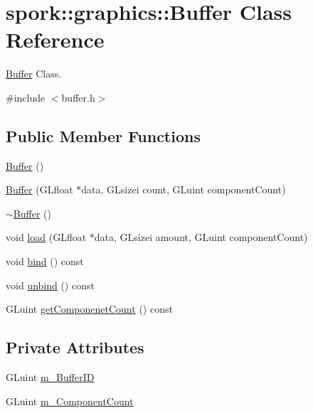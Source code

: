 \hypertarget{classspork_1_1graphics_1_1_buffer}{}\section{spork\+:\+:graphics\+:\+:Buffer Class Reference}
\label{classspork_1_1graphics_1_1_buffer}


\hyperlink{classspork_1_1graphics_1_1_buffer}{Buffer} Class.  




{\ttfamily \#include $<$buffer.\+h$>$}

\subsection*{Public Member Functions}
\begin{DoxyCompactItemize}
\item 
\hyperlink{classspork_1_1graphics_1_1_buffer_a6b445479994088e19ca363f366c95d25}{Buffer} ()
\item 
\hyperlink{classspork_1_1graphics_1_1_buffer_a743f6720ebcb279273203a29d8b7f0e9}{Buffer} (G\+Lfloat $\ast$data, G\+Lsizei count, G\+Luint component\+Count)
\item 
\hyperlink{classspork_1_1graphics_1_1_buffer_a5b19fccc64a6f5797d8946d826612ff8}{$\sim$\+Buffer} ()
\item 
void \hyperlink{classspork_1_1graphics_1_1_buffer_ab591a4012f5395a001174e62769dba9f}{load} (G\+Lfloat $\ast$data, G\+Lsizei amount, G\+Luint component\+Count)
\item 
void \hyperlink{classspork_1_1graphics_1_1_buffer_a93c4fb2f16f88a92e8561918a7d90cdd}{bind} () const
\item 
void \hyperlink{classspork_1_1graphics_1_1_buffer_a3cb844f62146486ed17a4f840ccdd975}{unbind} () const
\item 
G\+Luint \hyperlink{classspork_1_1graphics_1_1_buffer_a75f304bac73678502c9095cf0a3d6751}{get\+Componenet\+Count} () const
\end{DoxyCompactItemize}
\subsection*{Private Attributes}
\begin{DoxyCompactItemize}
\item 
G\+Luint \hyperlink{classspork_1_1graphics_1_1_buffer_a30d6a65987404601f22d9160605ffc90}{m\+\_\+\+Buffer\+ID}
\item 
G\+Luint \hyperlink{classspork_1_1graphics_1_1_buffer_a8d6c9bc231ebb8eb39fe010761e4e631}{m\+\_\+\+Component\+Count}
\end{DoxyCompactItemize}


